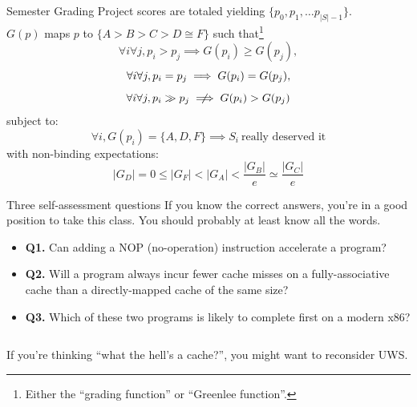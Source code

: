 \documentclass{beamer}
\newcommand{\code}[2]{
  \tiny{{}}
}
\begin{document}
\begin{frame}{Semester Grading}
Project scores are totaled yielding $\{p_0, p_1, \dotsc p_{|S| - 1}\}$.\linebreak \\
$G(p)$ maps $p$ to $\{A > B > C > D \cong F\}$ such that\footnote{Either the ``grading function'' or ``Greenlee function''.}
\begin{equation}
\forall i \forall j, p_i > p_j \implies G(p_i) \ge G(p_j), \nonumber
\end{equation}
\begin{equation}
\forall i \forall j, p_i = p_j \implies G(p_i) = G(p_j), \nonumber \linebreak
\end{equation}
\begin{equation}
\forall i \forall j, p_i\gg p_j \centernot\implies G(p_i) > G(p_j) \nonumber
\end{equation}
subject to:
\begin{equation}
\forall i, G(p_i) = \{A, D, F\} \implies S_i\ \text{really deserved it}\nonumber
\end{equation}
with non-binding expectations:
\begin{equation}
|G_D| = 0 \le |G_F| < |G_A| < \frac{|G_B|}{e} \simeq \frac{|G_C|}{e} \nonumber
\end{equation}
\end{frame}

\begin{frame}{Three self-assessment questions}
If you know the correct answers, you're in a good position to take this
class. You should probably at least know all the words.
\vspace{.1in}
\begin{itemize}
\item \textbf{Q1.} Can adding a NOP (no-operation) instruction accelerate a program?
\item \textbf{Q2.} Will a program always incur fewer cache misses on a fully-associative
	cache than a directly-mapped cache of the same size?
\item \textbf{Q3.} Which of these two programs is likely to complete first
	on a modern x86?\\
\begin{columns}
\begin{column}{.5\textwidth}
\code{A}{code/introq3a.S}
\end{column}
\begin{column}{.5\textwidth}
\code{B}{code/introq3b.S}
\end{column}
\end{columns}
\end{itemize}
\vspace{.1in}
If you're thinking ``what the hell's a cache?'', you might want to reconsider UWS.
\end{frame}
\end{document}

